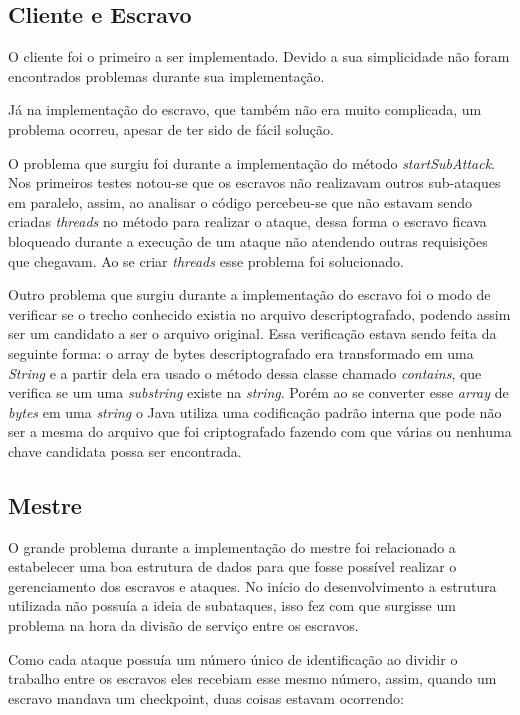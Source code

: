 \documentclass[
	12pt,				%
    oneside,			%
	a4paper,			%
	english,			%
	brazil,				%
	]{abntex2}
\begin{document}
\subsection{Cliente e Escravo}
O cliente foi o primeiro a ser implementado. Devido a sua simplicidade não foram encontrados problemas durante sua implementação.

Já na implementação do escravo, que também não era muito complicada, um problema ocorreu, apesar de 
ter sido de fácil solução.

O problema que surgiu foi durante a implementação do método \textit{startSubAttack}. Nos primeiros testes notou-se que os escravos não realizavam outros sub-ataques em paralelo, assim, ao analisar o código percebeu-se que não estavam sendo criadas \textit{threads} no método para realizar o ataque, dessa forma o escravo ficava bloqueado durante a execução de um ataque não atendendo outras requisições que chegavam. Ao se criar \textit{threads} esse problema foi solucionado.

Outro problema que surgiu durante a implementação do escravo foi o modo de verificar se o trecho conhecido existia no arquivo
descriptografado, podendo assim ser um candidato a ser o arquivo original. Essa verificação estava sendo feita da seguinte
forma: o array de bytes descriptografado era transformado em uma \textit{String} e a partir dela era usado o método dessa classe chamado \textit{contains}, que verifica se um uma \textit{substring} existe na \textit{string}. Porém ao se converter esse \textit{array} de \textit{bytes} em uma \textit{string} o Java utiliza uma codificação padrão interna que pode não ser a
mesma do arquivo que foi criptografado fazendo com que várias ou nenhuma chave candidata possa ser encontrada.

\subsection{Mestre}
O grande problema durante a implementação do mestre foi relacionado a estabelecer uma boa estrutura de dados para que fosse
possível realizar o gerenciamento dos escravos e ataques. No início do desenvolvimento a estrutura utilizada não possuía a ideia de subataques, isso fez com que surgisse um problema na hora da divisão de serviço entre os escravos. 

Como cada ataque possuía um número único de identificação ao dividir o trabalho entre os escravos eles recebiam esse mesmo número, assim, quando um escravo mandava um checkpoint, duas coisas estavam ocorrendo: 
\end{document}
